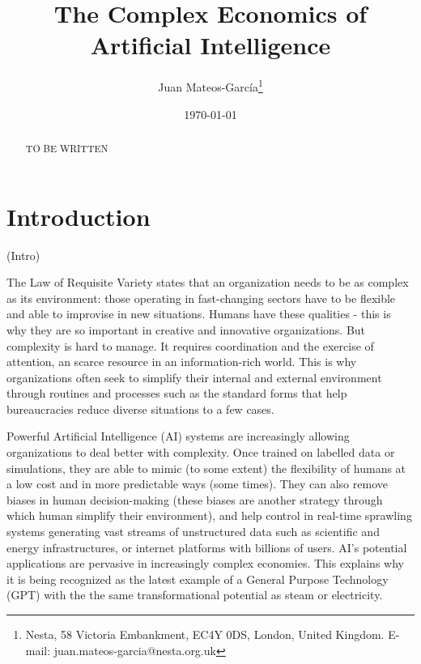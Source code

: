 \documentclass[11pt]{article}
\begin{document}
\begin{titlepage}
\title{The Complex Economics of Artificial Intelligence}
\author{Juan Mateos-Garc\'{i}a\thanks{Nesta, 58 Victoria Embankment, EC4Y 0DS, London, United Kingdom. E-mail: juan.mateos-garcia@nesta.org.uk}}
\date{\today}
\maketitle
\begin{abstract}
\noindent TO BE WRITTEN
\bigskip
\end{abstract}

\setcounter{page}{0}
\thispagestyle{empty}
\end{titlepage}

\section{Introduction}
(Intro)

The Law of Requisite Variety states that an organization needs to be as complex as its environment: those operating in fast-changing sectors have to be flexible and able to improvise in new situations. Humans have these qualities - this is why they are so important in creative and innovative organizations. But complexity is hard to manage. It requires coordination and the exercise of attention, an scarce resource in an information-rich world. This is why organizations often seek to simplify their internal and external environment through routines and processes such as the standard forms that help bureaucracies reduce diverse situations to a few cases. 

Powerful Artificial Intelligence (AI) systems are increasingly allowing organizations to deal better with complexity. Once trained on labelled data or simulations, they are able to mimic (to some extent) the flexibility of humans at a low cost and in more predictable ways (some times). They can also remove biases in human decision-making (these biases are another strategy through which human simplify their environment), and help control in real-time sprawling systems generating vast streams of unstructured data such as scientific and energy infrastructures, or internet platforms with billions of users. AI's potential applications are pervasive in increasingly complex economies. This explains why it is being recognized as the latest example of a General Purpose Technology (GPT) with the the same transformational potential as steam or electricity.
\end{document}
